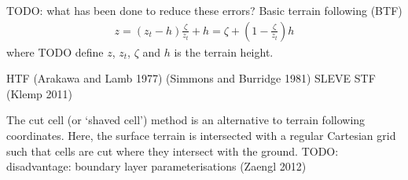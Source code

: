 


TODO: what has been done to reduce these errors?
Basic terrain following (BTF) \autocite{galchen-somerville1975} 
\begin{align}
z = \left( z_t - h \right) \frac{\zeta}{z_t} + h = \zeta + \left( 1 - \frac{\zeta}{z_t} \right) h
\end{align}
where TODO define $z$, $z_t$, $\zeta$ and $h$ is the terrain height.

HTF (Arakawa and Lamb 1977) (Simmons and Burridge 1981)
SLEVE
STF (Klemp 2011)

The cut cell (or `shaved cell')  method is an alternative to terrain following coordinates.  Here, the surface terrain is intersected with a regular Cartesian grid such that cells are cut where they intersect with the ground.  TODO: disadvantage: boundary layer parameterisations (Zaengl 2012)
